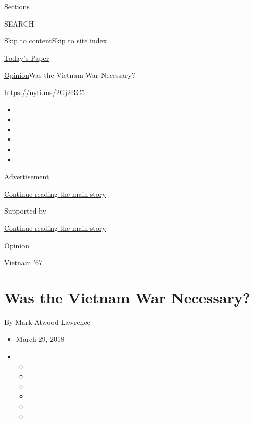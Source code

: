 Sections

SEARCH

\protect\hyperlink{site-content}{Skip to
content}\protect\hyperlink{site-index}{Skip to site index}

\href{https://myaccount.nytimes3xbfgragh.onion/auth/login?response_type=cookie\&client_id=vi}{}

\href{https://www.nytimes3xbfgragh.onion/section/todayspaper}{Today's
Paper}

\href{/section/opinion}{Opinion}\textbar{}Was the Vietnam War Necessary?

\url{https://nyti.ms/2Gj2RC5}

\begin{itemize}
\item
\item
\item
\item
\item
\item
\end{itemize}

Advertisement

\protect\hyperlink{after-top}{Continue reading the main story}

Supported by

\protect\hyperlink{after-sponsor}{Continue reading the main story}

\href{/section/opinion}{Opinion}

\href{/column/vietnam-67}{Vietnam '67}

\hypertarget{was-the-vietnam-war-necessary}{%
\section{Was the Vietnam War
Necessary?}\label{was-the-vietnam-war-necessary}}

By Mark Atwood Lawrence

\begin{itemize}
\item
  March 29, 2018
\item
  \begin{itemize}
  \item
  \item
  \item
  \item
  \item
  \item
  \end{itemize}
\end{itemize}

